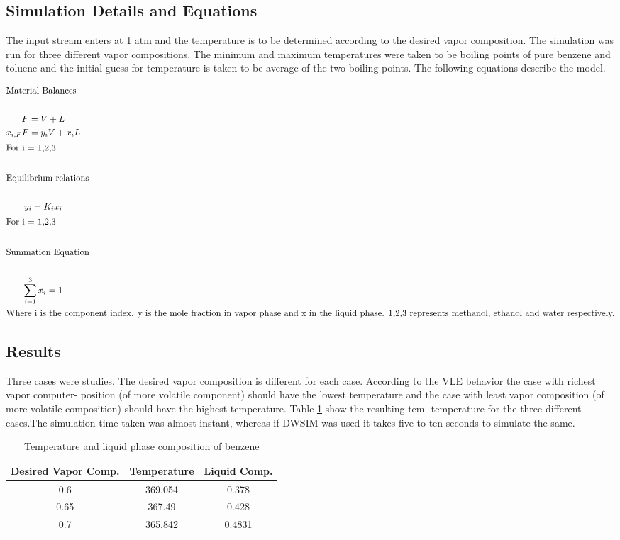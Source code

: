 \documentclass[12pt]{report}
\begin{document}
\subsection{Simulation Details and Equations}
The input stream enters at 1 atm and the temperature is to be determined according to the desired vapor composition. The simulation was run for three different vapor compositions. The minimum and maximum temperatures were taken to be boiling points of pure benzene and toluene and the initial guess for temperature is taken to be average of the two boiling points. The following equations describe the model.

\begin{gather*}
\intertext{Material Balances} \\
F=V+L \\
x_{i,F}F = y_iV + x_iL \\
\intertext{For i = 1,2,3} \\
\intertext{Equilibrium relations} \\
y_i = K_ix_i \\
\intertext{For i = 1,2,3} \\
\intertext{Summation Equation} \\
\sum_{i=1}^{3}x_i = 1 \\
\intertext{Where i is the component index. y is the mole fraction in vapor phase and x in the liquid phase. 1,2,3 represents methanol, ethanol and water respectively.}
\end{gather*}

\subsection{Results}
Three cases were studies. The desired vapor composition is different for each case. According to the VLE behavior the case with richest vapor computer- position (of more volatile component) should have the lowest temperature and the case with least vapor composition (of more volatile composition) should have the highest temperature. Table \ref{Tab:Flash} show the resulting tem- temperature for the three different cases.The simulation time taken was almost instant, whereas if DWSIM was used it takes five to ten seconds to simulate the same.

\begin{table}
\centering
\caption{Temperature and liquid phase composition of benzene}
\vspace{1ex}
\label{Tab:Flash}
\begin{tabular}{|c|c|c|} \hline
Desired Vapor Comp. & Temperature & Liquid Comp. \\ \hline
0.6 & 369.054 & 0.378 \\
0.65 & 367.49 & 0.428 \\
0.7 & 365.842 & 0.4831 \\ \hline
\end{tabular}
\end{table}
\end{document}
